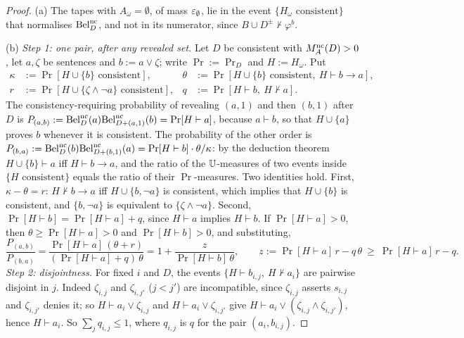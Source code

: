 \begin{proof}
(a) The tapes with $A_\omega=\emptyset$, of mass $\varepsilon_{\emptyset}$, lie in the event $\{H_\omega\text{ consistent}\}$ that normalises $\mathrm{Bel}^{\mathrm{nc}}_D$, and not in its numerator, since $B\cup D^\pm\nvdash\varphi^b$.

(b) \emph{Step 1: one pair, after any revealed set.} Let $D$ be consistent with $M_{A}^{\mathrm{nc}}(D)>0$, let $a,\zeta$ be sentences and $b:=a\vee\zeta$; write $\Pr:=\Pr_D$ and $H:=H_\omega$. Put
\[
\begin{aligned}
\kappa&:=\Pr[H\cup\{b\}\text{ consistent}],&\theta&:=\Pr[H\cup\{b\}\text{ consistent},\ H\vdash b\to a],\\
r&:=\Pr[H\cup\{\zeta\wedge\neg a\}\text{ consistent}],&q&:=\Pr[H\vdash b,\ H\nvdash a].
\end{aligned}
\]
The consistency-requiring probability of revealing $(a,1)$ and then $(b,1)$ after $D$ is $P_{(a,b)}:=\mathrm{Bel}^{\mathrm{nc}}_D(a)\mathrm{Bel}^{\mathrm{nc}}_{D+(a,1)}(b)=\Pr[H\vdash a]$, because $a\vdash b$, so that $H\cup\{a\}$ proves $b$ whenever it is consistent. The probability of the other order is $P_{(b,a)}:=\mathrm{Bel}^{\mathrm{nc}}_D(b)\mathrm{Bel}^{\mathrm{nc}}_{D+(b,1)}(a)=\Pr[H\vdash b]\cdot\theta/\kappa$: by the deduction theorem $H\cup\{b\}\vdash a$ iff $H\vdash b\to a$, and the ratio of the $\mathbb{U}$-measures of two events inside $\{H\text{ consistent}\}$ equals the ratio of their $\Pr$-measures. Two identities hold. First, $\kappa-\theta=r$: $H\nvdash b\to a$ iff $H\cup\{b,\neg a\}$ is consistent, which implies that $H\cup\{b\}$ is consistent, and $\{b,\neg a\}$ is equivalent to $\{\zeta\wedge\neg a\}$. Second, $\Pr[H\vdash b]=\Pr[H\vdash a]+q$, since $H\vdash a$ implies $H\vdash b$. If $\Pr[H\vdash a]>0$, then $\theta\ge\Pr[H\vdash a]>0$ and $\Pr[H\vdash b]>0$, and substituting,
\[
\frac{P_{(a,b)}}{P_{(b,a)}}=\frac{\Pr[H\vdash a]\,(\theta+r)}{(\Pr[H\vdash a]+q)\,\theta}=1+\frac{z}{\Pr[H\vdash b]\,\theta},\qquad z:=\Pr[H\vdash a]\,r-q\,\theta\ \ge\ \Pr[H\vdash a]\,r-q .
\]
\emph{Step 2: disjointness.} For fixed $i$ and $D$, the events $\{H\vdash b_{i,j},\ H\nvdash a_i\}$ are pairwise disjoint in $j$. Indeed $\zeta_{i,j}$ and $\zeta_{i,j'}$ ($j<j'$) are incompatible, since $\zeta_{i,j}$ asserts $s_{i,j}$ and $\zeta_{i,j'}$ denies it; so $H\vdash a_i\vee\zeta_{i,j}$ and $H\vdash a_i\vee\zeta_{i,j'}$ give $H\vdash a_i\vee(\zeta_{i,j}\wedge\zeta_{i,j'})$, hence $H\vdash a_i$. So $\sum_jq_{i,j}\le1$, where $q_{i,j}$ is $q$ for the pair $(a_i,b_{i,j})$.


\end{proof}
